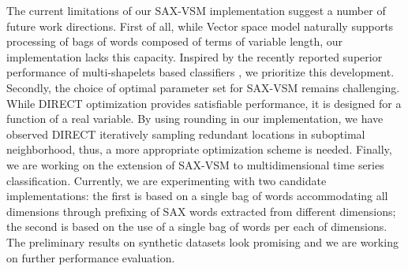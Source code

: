 \documentclass{llncs}
\begin{document}
The current limitations of our SAX-VSM implementation suggest a number of future work directions. 
First of all, while Vector space model naturally supports processing of bags of words composed 
of terms of variable length, our implementation lacks this capacity. 
Inspired by the recently reported superior performance of multi-shapelets based classifiers
\cite{bagnal}, we prioritize this development.
Secondly, the choice of optimal parameter set for SAX-VSM remains challenging.
While DIRECT optimization provides satisfiable performance, it is designed for a function of a real 
variable. By using rounding in our implementation, we have observed DIRECT iteratively sampling 
redundant locations in suboptimal neighborhood, thus, a more appropriate optimization scheme is
needed.
Finally, we are working on the extension of SAX-VSM to multidimensional time series classification.
Currently, we are experimenting with two candidate implementations: the first is based on a
single bag of words accommodating all dimensions through prefixing of SAX words extracted from
different dimensions; the second is based on the use of a single bag of words per each of
dimensions. The preliminary results on synthetic datasets look promising and we are
working on further performance evaluation.
%
%
\enlargethispage{0.5cm} 
\end{document}

